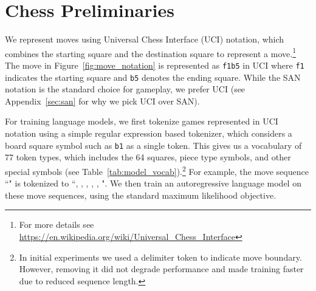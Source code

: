 
\section{Chess Preliminaries}
\label{sec:chess}


We represent moves using Universal Chess Interface (UCI) notation, which combines the starting square and the destination square to represent a move.\footnote{For more details see \url{https://en.wikipedia.org/wiki/Universal_Chess_Interface}} 
The move in Figure~\ref{fig:move_notation} is represented as \texttt{f1b5} in UCI where \texttt{f1} indicates the starting square and \texttt{b5} denotes the ending square.
While the SAN notation is the standard choice for gameplay, we prefer UCI %
(see Appendix~\ref{sec:san} for why we pick UCI over SAN). 

For training language models, we first tokenize games represented in UCI notation using a simple regular expression based tokenizer, which considers a board square symbol such as \texttt{b1} as a single token.
This gives us a vocabulary of 77 token types, 
which includes the 64 squares, piece type symbols, and other special symbols (see Table~\ref{tab:model_vocab}).\footnote{In initial experiments we used a delimiter token to indicate move boundary. However, removing it did not degrade performance and made training faster due to reduced sequence length.}
For example, the move sequence ``" is tokenized to ``, , , , , ". We then train an autoregressive language model on these move sequences, using the standard maximum likelihood objective.



